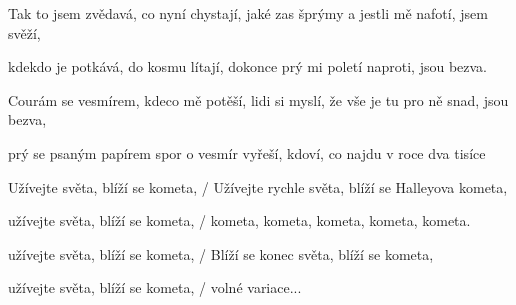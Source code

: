 \zr\kr

\zs
Tak to jsem zvědavá, co nyní chystají, jaké zas šprýmy a jestli mě nafotí, jsem svěží,

kdekdo je potkává, do kosmu lítají, dokonce prý mi poletí naproti, jsou bezva.

Courám se vesmírem, kdeco mě potěší, lidi si myslí, že vše je tu pro ně snad, jsou bezva,

prý se psaným papírem spor o vesmír vyřeší, kdoví, co najdu v roce dva tisíce  
\ks

\zr
Užívejte světa, blíží se kometa, / Užívejte rychle světa, blíží se Halleyova kometa,

užívejte světa, blíží se kometa, / kometa, kometa, kometa, kometa, kometa.

užívejte světa, blíží se kometa, / Blíží se konec světa, blíží se kometa,

užívejte světa, blíží se kometa, / volné variace...
\kr

\kp
